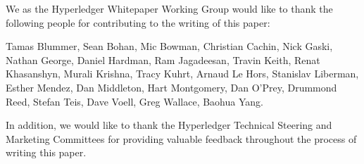 We as the Hyperledger Whitepaper Working Group would like to thank the following people for contributing to the writing of this paper:

Tamas Blummer, Sean Bohan, Mic Bowman, Christian Cachin, Nick Gaski, Nathan George, Daniel Hardman, Ram Jagadeesan, Travin Keith, Renat Khasanshyn, Murali Krishna, Tracy Kuhrt, Arnaud Le Hors, Stanislav Liberman, Esther Mendez, Dan Middleton, Hart Montgomery, Dan O'Prey, Drummond Reed, Stefan Teis, Dave Voell, Greg Wallace, Baohua Yang.


In addition, we would like to thank the Hyperledger Technical Steering and Marketing Committees for providing valuable feedback throughout the process of writing this paper.


